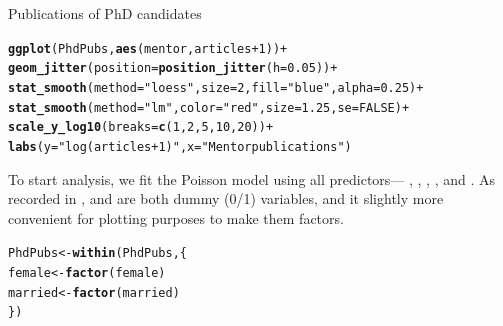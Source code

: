 \documentclass[11pt]{book}\usepackage[]{graphicx}\usepackage[]{color}
\makeatletter
\newcommand{\hlnum}[1]{\textcolor[rgb]{0.686,0.059,0.569}{#1}}%
\newcommand{\hlstr}[1]{\textcolor[rgb]{0.192,0.494,0.8}{#1}}%
\newcommand{\hlopt}[1]{\textcolor[rgb]{0,0,0}{#1}}%
\newcommand{\hlstd}[1]{\textcolor[rgb]{0.345,0.345,0.345}{#1}}%
\newcommand{\hlkwb}[1]{\textcolor[rgb]{0.69,0.353,0.396}{#1}}%
\newcommand{\hlkwc}[1]{\textcolor[rgb]{0.333,0.667,0.333}{#1}}%
\newcommand{\hlkwd}[1]{\textcolor[rgb]{0.737,0.353,0.396}{\textbf{#1}}}%
\newenvironment{kframe}{%
 \def\at@end@of@kframe{}%
 \ifinner\ifhmode%
  \def\at@end@of@kframe{\end{minipage}}%
  \begin{minipage}{\columnwidth}%
 \fi\fi%
 \def\FrameCommand##1{\hskip\@totalleftmargin \hskip-\fboxsep
 \colorbox{shadecolor}{##1}\hskip-\fboxsep
     \hskip-\linewidth \hskip-\@totalleftmargin \hskip\columnwidth}%
 \MakeFramed {\advance\hsize-\width
   \@totalleftmargin\z@ \linewidth\hsize
   \@setminipage}}%
 {\par\unskip\endMakeFramed%
 \at@end@of@kframe}
\newenvironment{knitrout}{}{} %
\renewenvironment{knitrout}{\small\renewcommand{\baselinestretch}{.85}}{} %
\makeatother
\begin{document}
\begin{Example}[phdpubs1]{Publications of PhD candidates}
\begin{knitrout}
\color{fgcolor}\begin{kframe}
\begin{alltt}
\hlkwd{ggplot}\hlstd{(PhdPubs,} \hlkwd{aes}\hlstd{(mentor, articles}\hlopt{+}\hlnum{1}\hlstd{))} \hlopt{+}
  \hlkwd{geom_jitter}\hlstd{(}\hlkwc{position}\hlstd{=}\hlkwd{position_jitter}\hlstd{(}\hlkwc{h}\hlstd{=}\hlnum{0.05}\hlstd{))} \hlopt{+}
  \hlkwd{stat_smooth}\hlstd{(}\hlkwc{method}\hlstd{=}\hlstr{"loess"}\hlstd{,} \hlkwc{size}\hlstd{=}\hlnum{2}\hlstd{,} \hlkwc{fill}\hlstd{=}\hlstr{"blue"}\hlstd{,} \hlkwc{alpha}\hlstd{=}\hlnum{0.25}\hlstd{)} \hlopt{+}
        \hlkwd{stat_smooth}\hlstd{(}\hlkwc{method}\hlstd{=}\hlstr{"lm"}\hlstd{,} \hlkwc{color}\hlstd{=}\hlstr{"red"}\hlstd{,} \hlkwc{size}\hlstd{=}\hlnum{1.25}\hlstd{,} \hlkwc{se}\hlstd{=}\hlnum{FALSE}\hlstd{)} \hlopt{+}
        \hlkwd{scale_y_log10}\hlstd{(}\hlkwc{breaks}\hlstd{=}\hlkwd{c}\hlstd{(}\hlnum{1}\hlstd{,}\hlnum{2}\hlstd{,}\hlnum{5}\hlstd{,}\hlnum{10}\hlstd{,}\hlnum{20}\hlstd{))} \hlopt{+}
        \hlkwd{labs}\hlstd{(}\hlkwc{y} \hlstd{=} \hlstr{"log (articles+1)"}\hlstd{,} \hlkwc{x}\hlstd{=}\hlstr{"Mentor publications"}\hlstd{)}
\end{alltt}
\end{kframe}
\end{knitrout}


To start analysis, we fit the Poisson model using all predictors---
, , , , and
. As recorded in ,  and
 are both dummy (0/1) variables, and it slightly
more convenient for plotting purposes to make them factors.

\begin{knitrout}
\color{fgcolor}\begin{kframe}
\begin{alltt}
\hlstd{PhdPubs} \hlkwb{<-} \hlkwd{within}\hlstd{(PhdPubs, \{}
  \hlstd{female} \hlkwb{<-} \hlkwd{factor}\hlstd{(female)}
  \hlstd{married} \hlkwb{<-} \hlkwd{factor}\hlstd{(married)}
\hlstd{\})}
\end{alltt}
\end{kframe}
\end{knitrout}


\end{Example}
\end{document}
